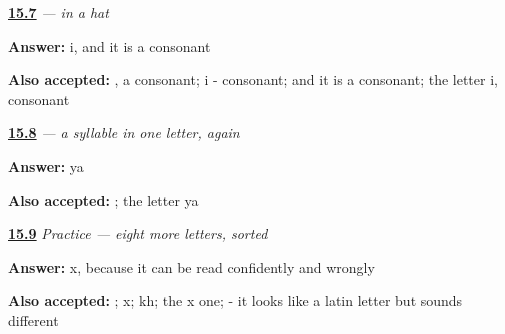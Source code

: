 \noindent\begin{minipage}[t]{\linewidth}
\raggedright
\hyperlink{review-RU-W07-y-short-base}{\textbf{15.7}} \emph{ —  in a hat}\par
\small \textbf{Answer:} i, and it is a consonant\par
\footnotesize \textbf{Also accepted:} , a consonant; i - consonant;  and it is a consonant; the letter i, consonant
\end{minipage}\par\medskip

\noindent\begin{minipage}[t]{\linewidth}
\raggedright
\hyperlink{review-RU-W07-yu-pattern}{\textbf{15.8}} \emph{ — a syllable in one letter, again}\par
\small \textbf{Answer:} ya\par
\footnotesize \textbf{Also accepted:} ; the letter ya
\end{minipage}\par\medskip

\noindent\begin{minipage}[t]{\linewidth}
\raggedright
\hyperlink{review-RU-C15-practice-false}{\textbf{15.9}} \emph{Practice — eight more letters, sorted}\par
\small \textbf{Answer:} x, because it can be read confidently and wrongly\par
\footnotesize \textbf{Also accepted:} ; x; kh; the x one;  - it looks like a latin letter but sounds different
\end{minipage}\par\medskip

